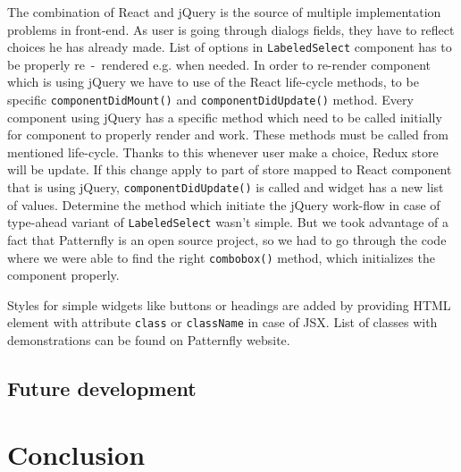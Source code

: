 The combination of React and jQuery is the source of multiple implementation problems in front-end. As user is going through dialogs fields, they have to reflect choices he has already made. List of options in \texttt{LabeledSelect} component has to be properly re~-~rendered e.g. when needed. In order to re-render component which is using jQuery we have to use of the React life-cycle methods, to be specific \texttt{componentDidMount()} and \texttt{componentDidUpdate()} method. Every component using jQuery has a specific method which need to be called initially for component to properly render and work. These methods must be called from mentioned life-cycle. Thanks to this whenever user make a choice, Redux store will be update. If this change apply to part of store mapped to React component that is using jQuery, \texttt{componentDidUpdate()} is called and widget has a new list of values. 
Determine the method which initiate the jQuery work-flow in case of type-ahead variant of \texttt{LabeledSelect} wasn't simple. But we took advantage of a fact that Patternfly is an open source project, so we had to go through the code where we were able to find the right \texttt{combobox()} method, which initializes the component properly.

Styles for simple widgets like buttons or headings are added by providing HTML element with attribute \texttt{class} or \texttt{className} in case of JSX. List of classes with demonstrations can be found on Patternfly website\cite{Patternfly}. 

\section{Future development}

\chapter{Conclusion}

